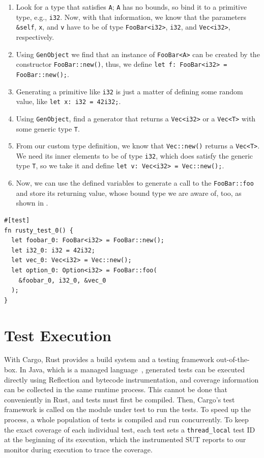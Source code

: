 \documentclass[paper=a4,%
  twoside,%
  BCOR4mm,%
  abstract=true,%
  toc=bibliography,%
  chapterprefix=true,%
  toc=bibliographynumbered,%
  open=right,%
  english,%
  pagesize=pdftex]{scrreprt}
\newcommand{\sut}{\ac{SUT}\xspace}
\begin{document}
\begin{enumerate}
    \item Look for a type that satisfies \texttt{A}; \texttt{A} has no bounds, so bind it to a primitive type, e.g., \texttt{i32}. Now, with that information, we know that the parameters \texttt{\string&self}, \texttt{x}, and \texttt{v} have to be of type \texttt{FooBar<i32>}, \texttt{i32}, and \texttt{Vec<i32>}, respectively.
    \item Using \texttt{GenObject} we find that an instance of \texttt{FooBar<A>} can be created by the constructor \texttt{FooBar::new()}, thus, we define \texttt{let f: FooBar<i32> = FooBar::new();}.
    \item Generating a primitive like \texttt{i32} is just a matter of defining some random value, like \texttt{let x: i32 = 42i32;}.
    \item Using \texttt{GenObject}, find a generator that returns a \texttt{Vec<i32>} or a \texttt{Vec<T>} with some generic type \texttt{T}.
    \item From our custom type definition, we know that \texttt{Vec::new()} returns a \texttt{Vec<T>}. We need its inner elements to be of type \texttt{i32}, which does satisfy the generic type \texttt{T}, so we take it and define \texttt{let v: Vec<i32> = Vec::new();}.
    \item Now, we can use the defined variables to generate a call to the \texttt{FooBar::foo} and store its returning value, whose bound type we are aware of, too, as shown in .
\end{enumerate}

\begin{lstlisting}[style=boxed, caption={An example test that invokes \texttt{FooBar::foo}}, label=lst:example-generated-test]
#[test]
fn rusty_test_0() {
  let foobar_0: FooBar<i32> = FooBar::new();
  let i32_0: i32 = 42i32;
  let vec_0: Vec<i32> = Vec::new();
  let option_0: Option<i32> = FooBar::foo(
    &foobar_0, i32_0, &vec_0
  );
}
\end{lstlisting}

\section{Test Execution}
With Cargo, Rust provides a build system and a testing framework out-of-the-box. In Java, which is a managed language~\cite{Gough2005}, generated tests can be executed directly using Reflection and bytecode instrumentation, and coverage information can be collected in the same runtime process. This cannot be done that conveniently in Rust, and tests must first be compiled. Then, Cargo's test framework is called on the module under test to run the tests. To speed up the process, a whole population of tests is compiled and run concurrently. To keep the exact coverage of each individual test, each test sets a \texttt{thread\string_local} test ID at the beginning of its execution, which the instrumented \sut reports to our monitor during execution to trace the coverage.
\end{document}
